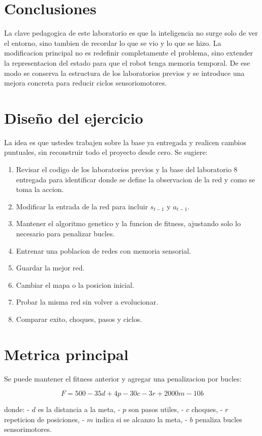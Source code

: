 \documentclass[11pt,a4paper]{article}
\begin{document}
\section{Conclusiones}
La clave pedagogica de este laboratorio es que la inteligencia no surge solo de ver el entorno, sino tambien de recordar lo que se vio y lo que se hizo. La modificacion principal no es redefinir completamente el problema, sino extender la representacion del estado para que el robot tenga memoria temporal. De ese modo se conserva la estructura de los laboratorios previos y se introduce una mejora concreta para reducir ciclos sensoriomotores.

\section{Diseño del ejercicio}
La idea es que ustedes trabajen sobre la base ya entregada y realicen cambios puntuales, sin reconstruir todo el proyecto desde cero. Se sugiere:
\begin{enumerate}[leftmargin=*]
  \item Revisar el codigo de los laboratorios previos y la base del laboratorio 8 entregada para identificar donde se define la observacion de la red y como se toma la accion.
  \item Modificar la entrada de la red para incluir $s_{t-1}$ y $a_{t-1}$.
  \item Mantener el algoritmo genetico y la funcion de fitness, ajustando solo lo necesario para penalizar bucles.
  \item Entrenar una poblacion de redes con memoria sensorial.
  \item Guardar la mejor red.
  \item Cambiar el mapa o la posicion inicial.
  \item Probar la misma red sin volver a evolucionar.
  \item Comparar exito, choques, pasos y ciclos.
\end{enumerate}

\section{Metrica principal}
Se puede mantener el fitness anterior y agregar una penalizacion por bucles:

\[
F = 500 - 35d + 4p - 30c - 3r + 2000m - 10b
\]

donde:
- $d$ es la distancia a la meta,
- $p$ son pasos utiles,
- $c$ choques,
- $r$ repeticion de posiciones,
- $m$ indica si se alcanzo la meta,
- $b$ penaliza bucles sensorimotores.
\end{document}
